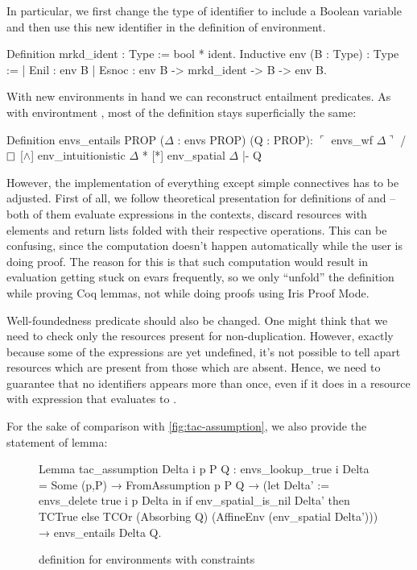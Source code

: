 In particular, we first change the type of identifier to include a Boolean variable and then use this new identifier in the definition of environment.

\begin{coq}
  Definition mrkd_ident : Type := bool * ident.
  Inductive env (B : Type) : Type :=
  | Enil : env B
  | Esnoc : env B -> mrkd_ident -> B -> env B.
\end{coq}

With new environments in hand we can reconstruct entailment predicates.
As with environtment , most of the definition stays superficially the same:
\begin{coq}
  Definition envs_entails {PROP} ($\Delta$ : envs PROP) (Q : PROP):
  $\ulcorner$ envs_wf $\Delta \urcorner$ /\ $\intuit$ [$\wedge$] env_intuitionistic $\Delta$ * [*] env_spatial $\Delta$ |- Q
\end{coq}

However, the implementation of everything except simple connectives has to be adjusted.
First of all, we follow theoretical presentation for definitions of \coqe{$\intuit$ [$\wedge$]} and \coqe{[*]} -- both of them evaluate expressions in the contexts, discard resources with \false elements and return lists folded with their respective operations.
This can be confusing, since the computation doesn't happen automatically while the user is doing proof.
The reason for this is that such computation would result in evaluation getting stuck on evars frequently, so we only ``unfold'' the definition while proving Coq lemmas, not while doing proofs using Iris Proof Mode.

Well-foundedness predicate should also be changed.
One might think that we need to check only the resources present for non-duplication.
However, exactly because some of the expressions are yet undefined, it's not possible to tell apart resources which are present from those which are absent.
Hence, we need to guarantee that no identifiers appears more than once, even if it does in a resource with expression that evaluates to \false.

For the sake of comparison with \ref{fig:tac-assumption}, we also provide the statement of  lemma:

\begin{figure}[H]
  \begin{coq}
Lemma tac_assumption Delta i p P Q :
  envs_lookup_true i Delta = Some (p,P) →
  FromAssumption p P Q →
  (let Delta' := envs_delete true i p Delta in
   if env_spatial_is_nil Delta' then TCTrue
   else TCOr (Absorbing Q) (AffineEnv (env_spatial Delta'))) →
  envs_entails Delta Q.
  \end{coq}
  \caption{ definition for environments with constraints}
  \label{fig:tac-assumption-constr}
\end{figure}

